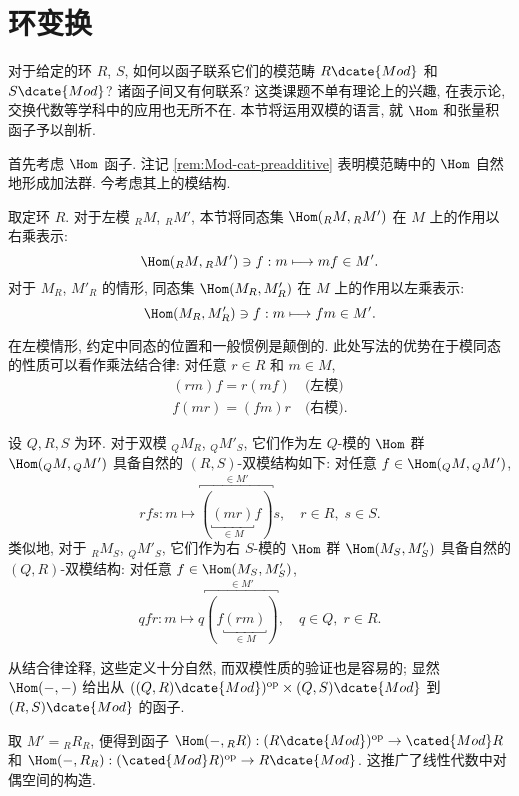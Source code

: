 \section{环变换}\label{sec:change-of-rings}
对于给定的环 $R$, $S$, 如何以函子联系它们的模范畴 $R\dcate{Mod}$ 和 $S\dcate{Mod}$? 诸函子间又有何联系? 这类课题不单有理论上的兴趣, 在表示论, 交换代数等学科中的应用也无所不在. 本节将运用双模的语言, 就 $\Hom$ 和张量积函子予以剖析.

首先考虑 $\Hom$ 函子. 注记 \ref{rem:Mod-cat-preadditive} 表明模范畴中的 $\Hom$ 自然地形成加法群. 今考虑其上的模结构.

\begin{convention}\label{con:Hom-assoc}
	取定环 $R$. 对于左模 ${}_R M$, ${}_R M'$, 本节将同态集 $\Hom({}_R M, {}_R M')$ 在 $M$ 上的作用以右乘表示:
	\[ \Hom({}_R M, {}_R M') \ni f: m \longmapsto mf \in M'. \]
	对于 $M_R$, $M'_R$ 的情形, 同态集 $\Hom(M_R, M'_R)$ 在 $M$ 上的作用以左乘表示:
	\[ \Hom(M_R, M'_R) \ni f: m \longmapsto fm \in M'. \]
\end{convention}
在左模情形, 约定中同态的位置和一般惯例是颠倒的. 此处写法的优势在于模同态的性质可以看作乘法结合律: 对任意 $r \in R$ 和 $m \in M$,
\begin{gather*}
	(rm)f = r(mf) \quad \text{(左模)} \\ 
	f(mr) = (fm)r \quad \text{(右模)}.
\end{gather*}

\begin{definition}\label{def:Hom-bimodule}
	设 $Q, R, S$ 为环. 对于双模 ${}_Q M_R$, ${}_Q M'_S$, 它们作为左 $Q$-模的 $\Hom$ 群 $\Hom({}_Q M, {}_Q M')$ 具备自然的 $(R, S)$-双模结构如下: 对任意 $f \in \Hom({}_Q M, {}_Q M')$,
	\[ rfs: m \longmapsto \overbracket{( \underbracket{(mr)}_{\in M} f )}^{\in M'} s, \quad r \in R, \; s \in S. \]
	类似地, 对于 ${}_R M_S$, ${}_Q M'_S$, 它们作为右 $S$-模的 $\Hom$ 群 $\Hom(M_S, M'_S)$ 具备自然的 $(Q, R)$-双模结构: 对任意 $f \in \Hom(M_S, M'_S)$,
	\[ qfr: m \longmapsto q \overbracket{( f\underbracket{(rm)}_{\in M} )}^{\in M'}, \quad q \in Q, \; r \in R. \]
\end{definition}
从结合律诠释, 这些定义十分自然, 而双模性质的验证也是容易的; 显然 $\Hom(-,-)$ 给出从 $((Q,R)\dcate{Mod})^\text{op} \times (Q,S)\dcate{Mod}$ 到 $(R,S)\dcate{Mod}$ 的函子.

\begin{example}[对偶函子]
	取 $M' = {}_R R_R$, 便得到函子 $\Hom(-, {}_R R): (R\dcate{Mod})^\text{op} \to \cated{Mod}R$ 和 $\Hom(-, R_R): (\cated{Mod}R)^\text{op} \to R\dcate{Mod}$. 这推广了线性代数中对偶空间的构造.
\end{example}

